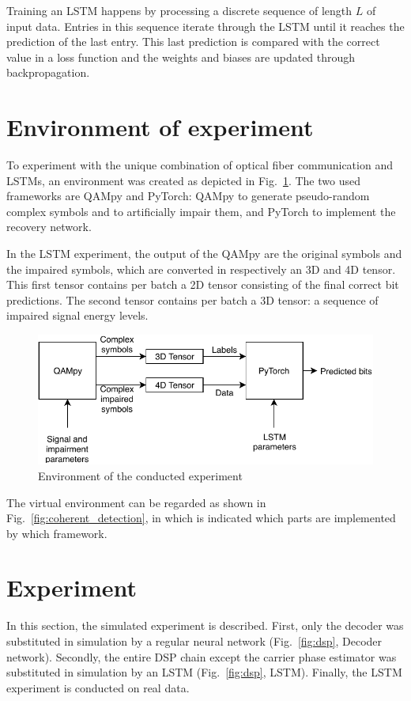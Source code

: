 \documentclass[journal,10pt,twoside, a4paper]{IEEEtran}
\begin{document}
Training an LSTM happens by processing a discrete sequence of length $L$ of input data. Entries in this sequence iterate through the LSTM until it reaches the prediction of the last entry. This last prediction is compared with the correct value in a loss function and the weights and biases are updated through backpropagation. 

\section{Environment of experiment}
To experiment with the unique combination of optical fiber communication and LSTMs, an environment was created as depicted in Fig.~\ref{fig:combi}. The two used frameworks are QAMpy and PyTorch: QAMpy to generate pseudo-random complex symbols and to artificially impair them, and PyTorch to implement the recovery network.

In the LSTM experiment, the output of the QAMpy are the original symbols and the impaired symbols, which are converted in respectively an 3D and 4D tensor. This first tensor contains per batch a 2D tensor consisting of the final correct bit predictions. The second tensor contains per batch a 3D tensor: a sequence of impaired signal energy levels.

\begin{figure}
    \centering
    \includegraphics[width=0.9\linewidth]{Thesis/images/framework_combi.pdf}
    \caption{Environment of the conducted experiment}
    \label{fig:combi}
\end{figure}

The virtual environment can be regarded as shown in Fig.~\ref{fig:coherent_detection}, in which is indicated which parts are implemented by which framework.

\section{Experiment}
In this section, the simulated experiment is described. First, only the decoder was substituted in simulation by a regular neural network (Fig.~\ref{fig:dsp}, Decoder network). Secondly, the entire DSP chain except the carrier phase estimator was substituted in simulation by an LSTM (Fig.~\ref{fig:dsp}, LSTM). Finally, the LSTM experiment is conducted on real data. 
\end{document}
